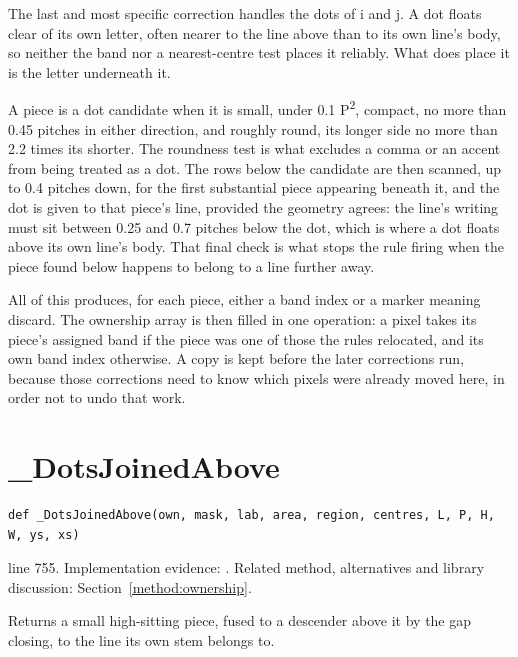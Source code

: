 The last and most specific correction handles the dots of i and j. A dot floats clear of its own letter, often nearer to the line above than to its own line's body, so neither the band nor a nearest-centre test places it reliably. What does place it is the letter underneath it.

A piece is a dot candidate when it is small, under 0.1 P\textsuperscript{2}, compact, no more than 0.45 pitches in either direction, and roughly round, its longer side no more than 2.2 times its shorter. The roundness test is what excludes a comma or an accent from being treated as a dot. The rows below the candidate are then scanned, up to 0.4 pitches down, for the first substantial piece appearing beneath it, and the dot is given to that piece's line, provided the geometry agrees: the line's writing must sit between 0.25 and 0.7 pitches below the dot, which is where a dot floats above its own line's body. That final check is what stops the rule firing when the piece found below happens to belong to a line further away.


All of this produces, for each piece, either a band index or a marker meaning discard. The ownership array is then filled in one operation: a pixel takes its piece's assigned band if the piece was one of those the rules relocated, and its own band index otherwise. A copy is kept before the later corrections run, because those corrections need to know which pixels were already moved here, in order not to undo that work.



\section{\_DotsJoinedAbove}\label{fn:segment:-DotsJoinedAbove}
\begin{lstlisting}[style=sig]
def _DotsJoinedAbove(own, mask, lab, area, region, centres, L, P, H, W, ys, xs)
\end{lstlisting}
 line 755. Implementation evidence: \cite{code2026}. Related method, alternatives and library discussion: Section~\ref{method:ownership}.


Returns a small high-sitting piece, fused to a descender above it by the gap closing, to the line its own stem belongs to.




